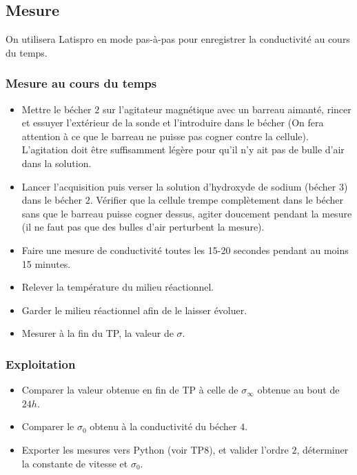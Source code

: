 \documentclass{tp}
\begin{document}
\subsection{Mesure}

On utilisera Latispro en mode pas-à-pas pour enregistrer la conductivité au cours du temps.

\subsubsection{Mesure au cours du temps}

\begin{itemize}

\item Mettre le bécher $2$ sur l'agitateur magnétique avec un barreau aimanté, rincer et essuyer l'extérieur de la sonde et
l'introduire dans le bécher (On fera attention à ce que le barreau ne puisse pas cogner contre la cellule). L'agitation doit être suffisamment légère pour qu'il n'y ait pas de bulle d'air dans la solution.

\item Lancer l'acquisition puis verser la solution d'hydroxyde de sodium (bécher $3$) dans le bécher $2$. Vérifier que la cellule trempe complètement dans le bécher sans que le barreau puisse cogner dessus, agiter doucement pendant la mesure (il ne faut pas que des bulles d'air perturbent la mesure).

  \item Faire une mesure de conductivité toutes les 15-20 secondes pendant au moins 15 minutes.

\item Relever la température du milieu réactionnel.
\item Garder le milieu réactionnel afin de le laisser évoluer.
\item Mesurer à la fin du TP, la valeur de $\sigma$.
\end{itemize}

\subsubsection{Exploitation}
\begin{itemize}
\item Comparer la valeur obtenue en fin de TP à celle de $\sigma_{\infty}$ obtenue au bout de $24 \si{h}$.
\item Comparer le $\sigma_0$ obtenu à la conductivité du bécher $4$.
\item Exporter les mesures vers Python (voir TP8), et valider l'ordre $2$, déterminer la constante de vitesse et $\sigma_0$.

\end{itemize}
\end{document}
